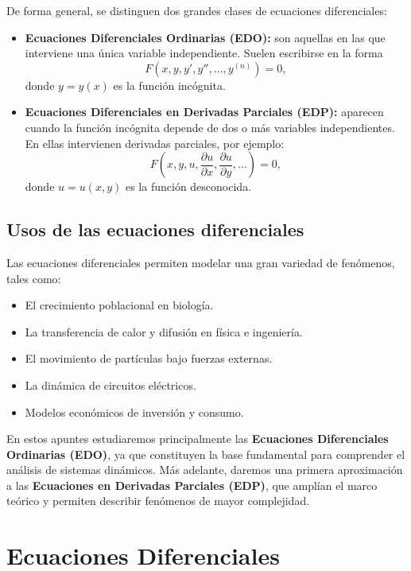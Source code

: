 De forma general, se distinguen dos grandes clases de ecuaciones diferenciales:

\begin{itemize}
    \item \textbf{Ecuaciones Diferenciales Ordinarias (EDO):} son aquellas en las que interviene una 
    única variable independiente. Suelen escribirse en la forma
    \[
        F\left(x, y, y', y'', \dots, y^{(n)}\right) = 0,
    \]
    donde $y = y(x)$ es la función incógnita.
    
    \item \textbf{Ecuaciones Diferenciales en Derivadas Parciales (EDP):} aparecen cuando la función 
    incógnita depende de dos o más variables independientes. En ellas intervienen derivadas parciales, por ejemplo:
    \[
        F\left(x, y, u, \frac{\partial u}{\partial x}, \frac{\partial u}{\partial y}, \dots \right) = 0,
    \]
    donde $u = u(x,y)$ es la función desconocida.
\end{itemize}

\subsection*{Usos de las ecuaciones diferenciales}

Las ecuaciones diferenciales permiten modelar una gran variedad de fenómenos, tales como:

\begin{itemize}
    \item El crecimiento poblacional en biología.
    \item La transferencia de calor y difusión en física e ingeniería.
    \item El movimiento de partículas bajo fuerzas externas.
    \item La dinámica de circuitos eléctricos.
    \item Modelos económicos de inversión y consumo.
\end{itemize}

En estos apuntes estudiaremos principalmente las \textbf{Ecuaciones Diferenciales Ordinarias (EDO)}, 
ya que constituyen la base fundamental para comprender el análisis de sistemas dinámicos.  
Más adelante, daremos una primera aproximación a las \textbf{Ecuaciones en Derivadas Parciales (EDP)}, 
que amplían el marco teórico y permiten describir fenómenos de mayor complejidad.

\newpage

\section*{Ecuaciones Diferenciales}

